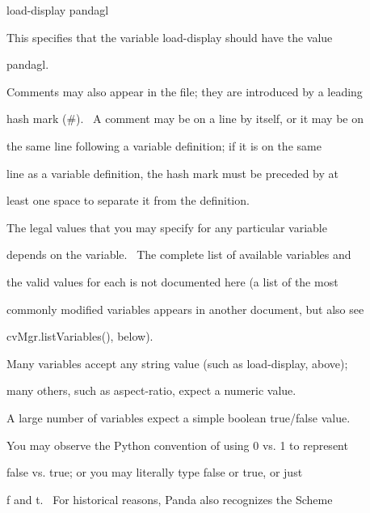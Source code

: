\documentclass[a4paper]{article}
\begin{document}
\bigskip

{\color{black}
load-display pandagl}


\bigskip

{\color{black}
This specifies that the variable {\textquotedbl}load-display{\textquotedbl} should have the value}

{\color{black}
{\textquotedbl}pandagl{\textquotedbl}.}


\bigskip

{\color{black}
Comments may also appear in the file; they are introduced by a leading}

{\color{black}
hash mark (\#). \ A comment may be on a line by itself, or it may be on}

{\color{black}
the same line following a variable definition; if it is on the same}

{\color{black}
line as a variable definition, the hash mark must be preceded by at}

{\color{black}
least one space to separate it from the definition.}


\bigskip


\bigskip

{\color{black}
The legal values that you may specify for any particular variable}

{\color{black}
depends on the variable. \ The complete list of available variables and}

{\color{black}
the valid values for each is not documented here (a list of the most}

{\color{black}
commonly modified variables appears in another document, but also see}

{\color{black}
cvMgr.listVariables(), below).}


\bigskip

{\color{black}
Many variables accept any string value (such as load-display, above);}

{\color{black}
many others, such as aspect-ratio, expect a numeric value.}


\bigskip

{\color{black}
A large number of variables expect a simple boolean true/false value.}

{\color{black}
You may observe the Python convention of using 0 vs. 1 to represent}

{\color{black}
false vs. true; or you may literally type {\textquotedbl}false{\textquotedbl} or {\textquotedbl}true{\textquotedbl}, or
just}

{\color{black}
{\textquotedbl}f{\textquotedbl} and {\textquotedbl}t{\textquotedbl}. \ For historical reasons, Panda also recognizes the
Scheme}
\end{document}
